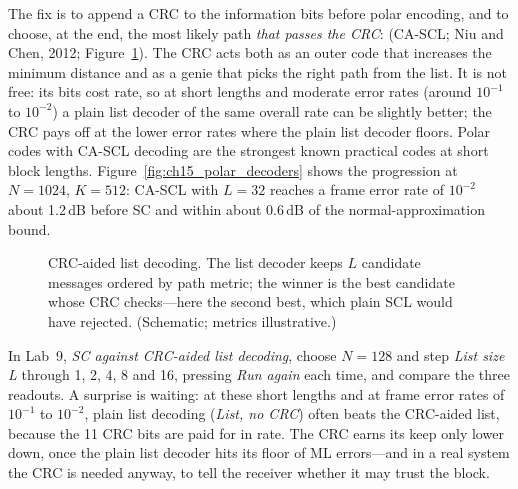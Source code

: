 The fix is to append a CRC to the information bits before polar encoding, and to choose, at the end,
the most likely path \emph{that passes the CRC}:  (CA-SCL; Niu and Chen, 2012; Figure~\ref{fig:ch15_cascl}).
The CRC acts both as an outer code that increases the minimum distance and as a genie that picks the
right path from the list. It is not free: its bits cost rate, so at short lengths and moderate
error rates (around $10^{-1}$ to $10^{-2}$) a plain list decoder of the same overall rate can be
slightly better; the CRC pays off at the lower error rates where the plain list decoder floors.
Polar codes with CA-SCL decoding are the strongest known practical codes at
short block lengths. Figure~\ref{fig:ch15_polar_decoders} shows the progression at $N=1024$, $K=512$:
CA-SCL with $L=32$ reaches a frame error rate of $10^{-2}$ about 1.2\,dB before SC and within about
0.6\,dB of the normal-approximation bound.

\begin{figure}[H]\centering
{}
\caption{CRC-aided list decoding. The list decoder keeps $L$ candidate messages ordered by path
metric; the winner is the best candidate whose CRC checks---here the second best, which plain SCL
would have rejected. (Schematic; metrics illustrative.)}
\label{fig:ch15_cascl}\end{figure}

\begin{tryit}
In Lab~9, \emph{SC against CRC-aided list decoding}, choose $N=128$ and step \emph{List size L}
through 1, 2, 4, 8 and 16, pressing \emph{Run again} each time, and compare the three readouts.
A surprise is waiting: at these short lengths and at frame error rates of $10^{-1}$ to $10^{-2}$,
plain list decoding (\emph{List, no CRC}) often beats the CRC-aided list, because the 11 CRC bits
are paid for in rate. The CRC earns its keep only lower down, once the plain list decoder hits its
floor of ML errors---and in a real system the CRC is needed anyway, to tell the receiver whether
it may trust the block.
\end{tryit}

